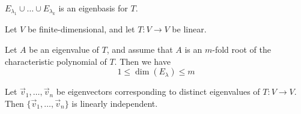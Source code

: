 \documentclass[11pt,fleqn]{book} %
\begin{document}
$E_{\lambda_1} \cup \dots \cup E_{\lambda_k}$ is an eigenbasis for $T$.

\setcounter{chapter}{4}
\setcounter{dummy}{5}
\begin{proposition}
    Let $V$ be finite-dimensional, and let $T: V \to V$ be linear.
    
    Let $A$ be an eigenvalue of $T$, and assume that $A$ is an $m$-fold root of the characteristic polynomial of $T$. Then we have $$1 \le \dim(E_\lambda) \le m$$
\end{proposition}

\setcounter{dummy}{3}
\begin{proposition}
    Let $\vec{v}_1, \dots, \vec{v}_n$ be eigenvectors corresponding to distinct eigenvalues of $T: V \to V$. Then $\{ \vec{v}_1, \dots, \vec{v}_n \}$  is linearly independent. 
\end{proposition}
\setcounter{chapter}{3}
\end{document}
